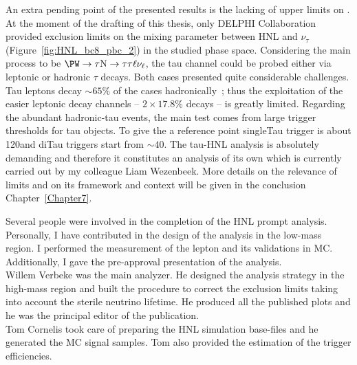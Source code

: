 An extra pending point of the presented results is the lacking of
upper limits on \mixpart. At the moment of the drafting of this
thesis, only DELPHI Collaboration~\cite{Abreu:1996pa}  
provided exclusion limits on the mixing parameter between HNL and
$\nu_{\tau}$ (Figure~\ref{fig:HNL_bc8_pbc_2}) in the studied phase
space. Considering the main process to be
$\PW
\rightarrow \tau \hnl
\rightarrow \tau \tau \ell \nu_{\ell}$, the tau channel could be
probed either via leptonic or hadronic $\tau$ decays. Both cases
presented quite considerable challenges. Tau leptons decay $\sim 65\%$
of the cases hadronically~\cite{pdgw}; thus the exploitation of the
easier leptonic decay channels -- $2 \times 17.8\%$ decays --
is greatly limited. Regarding the abundant hadronic-tau events, the
main test comes from large \pt trigger thresholds for
tau objects. To give the a reference point singleTau trigger is about
120\GeV and diTau triggers start from $\sim 40$\GeV. The
tau-HNL analysis is absolutely demanding and therefore it constitutes
an analysis of its own which is currently carried out by my colleague
Liam Wezenbeek. More details on the relevance of \mixpart limits and on its
framework and context will be given in the conclusion
Chapter~\ref{Chapter7}.\\

\vspace{3cm}

Several people were involved in the completion of the HNL prompt
analysis.\\
Personally, I have contributed in the design of the analysis in the low-mass
region. I performed the measurement of the lepton \fr and its
validations in MC.\\
Additionally, I gave the pre-approval presentation of the analysis.\\
Willem Verbeke was the main analyzer. He designed the analysis strategy in the
high-mass region and built the procedure to
correct the exclusion limits taking into account the sterile neutrino
lifetime. He produced all the published plots and he was the principal
editor of the publication.\\
Tom Cornelis took care of preparing the HNL simulation base-files and
he generated the MC signal samples. Tom also provided the estimation
of the trigger efficiencies. 


